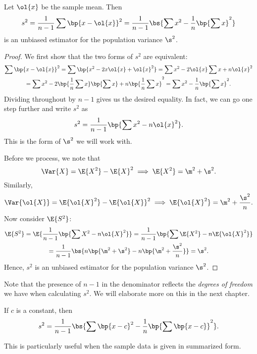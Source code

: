 \begin{proposition}
    Let $\ol{x}$ be the sample mean. Then \[s^2 = \frac{1}{n-1} \sum \bp{x - \ol{x}}^2 = \frac1{n-1} \bs{\sum x^2 - \frac1n \bp{\sum x}^2}\] is an unbiased estimator for the population variance $\s^2$.
\end{proposition}
\begin{proof}
    We first show that the two forms of $s^2$ are equivalent:
    \begin{gather*}
        \sum \bp{x - \ol{x}}^2 = \sum \bp{x^2 - 2x\ol{x} + \ol{x}^2} = \sum x^2 - 2\ol{x} \sum x + n \ol{x}^2\\
        = \sum x^2 - 2\bp{\frac1n \sum x}\bp{\sum x} + n \bp{\frac1{n} \sum x}^2 = \sum x^2 - \frac1n \bp{\sum x}^2.
    \end{gather*}
    Dividing throughout by $n-1$ gives us the desired equality. In fact, we can go one step further and write $s^2$ as \[s^2 = \frac1{n-1} \bp{\sum x^2 - n \ol{x}^2}.\] This is the form of $\s^2$ we will work with.

    Before we process, we note that \[\Var{X} = \E{X^2} - \E{X}^2 \implies \E{X^2} = \m^2 + \s^2.\] Similarly, \[\Var{\ol{X}} = \E{\ol{X}^2} - \E{\ol{X}}^2 \implies \E{\ol{X}^2} = \m^2 + \frac{\s^2}{n}.\] Now consider $\E{S^2}$:
    \begin{gather*}
        \E{S^2} = \E{\frac1{n-1} \bp{\sum X^2 - n \ol{X}^2}} = \frac1{n-1} \bp{\sum \E{X^2} - n \E{\ol{X}^2}}\\
        = \frac1{n-1} \bs{n \bp{\m^2 + \s^2} - n \bp{\m^2 + \frac{\s^2}{n}}} = \s^2.
    \end{gather*}
    Hence, $s^2$ is an unbiased estimator for the population variance $\s^2$.
\end{proof}

Note that the presence of $n-1$ in the denominator reflects the \emph{degrees of freedom} we have when calculating $s^2$. We will elaborate more on this in the next chapter.

\begin{corollary}
    If $c$ is a constant, then \[s^2 = \frac1{n-1} \bs{\sum \bp{x-c}^2 - \frac1n \bp{\sum \bp{x-c}}^2}.\]
\end{corollary}

This is particularly useful when the sample data is given in summarized form.